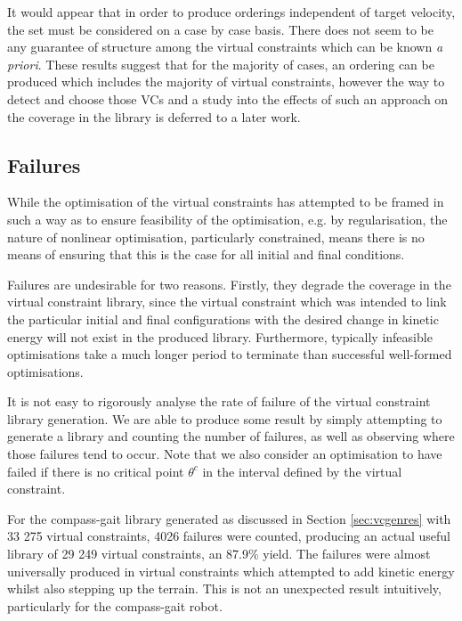 It would appear that in order to produce orderings independent of target velocity, the set must be considered on a case by case basis. There does not seem to be any guarantee of structure among the virtual constraints which can be known \textit{a priori}. These results suggest that for the majority of cases, an ordering can be produced which includes the majority of virtual constraints, however the way to detect and choose those VCs and a study into the effects of such an approach on the coverage in the library is deferred to a later work.

\subsection{Failures}
While the optimisation of the virtual constraints has attempted to be framed in such a way as to ensure feasibility of the optimisation, e.g. by regularisation, the nature of nonlinear optimisation, particularly constrained, means there is no means of ensuring that this is the case for all initial and final conditions.

Failures are undesirable for two reasons. Firstly, they degrade the coverage in the virtual constraint library, since the virtual constraint which was intended to link the particular initial and final configurations with the desired change in kinetic energy will not exist in the produced library. Furthermore, typically infeasible optimisations take a much longer period to terminate than successful well-formed optimisations.

It is not easy to rigorously analyse the rate of failure of the virtual constraint library generation. We are able to produce some result by simply attempting to generate a library and counting the number of failures, as well as observing where those failures tend to occur. Note that we also consider an optimisation to have failed if there is no critical point $\theta^c$ in the interval defined by the virtual constraint.

For the compass-gait library generated as discussed in Section \ref{sec:vcgenres} with 33 275 virtual constraints, 4026 failures were counted, producing an actual useful library of 29 249 virtual constraints, an 87.9\% yield. The failures were almost universally produced in virtual constraints which attempted to add kinetic energy whilst also stepping up the terrain. This is not an unexpected result intuitively, particularly for the compass-gait robot.